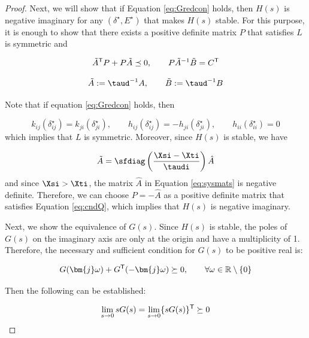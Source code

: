 \documentclass[graybox, envcountchap]{svmult}
\begin{document}
\begin{proof}
Next, we will show that if Equation \ref{eq:Gredcon} holds, then $H(s)$ is
negative imaginary for any $(\delta^{\star},E^{\star})$ that makes $H(s)$
stable. For this purpose, it is enough to show that there exists a positive
definite matrix $P$ that satisfies $L$ is symmetric and

\begin{equation}\label{eq:cndQ}
  \tilde{A}^{\sf T}P + P\tilde{A} \preceq 0
  ,\qquad
  P\tilde{A}^{-1}\tilde{B}=C^{\sf T}
\end{equation}

\begin{equation*}
  \tilde{A}:= \taud^{-1}A
  ,\qquad
  \tilde{B}:= \taud^{-1}B
\end{equation*}

Note that if equation \ref{eq:Gredcon} holds, then

\begin{equation*}
  k_{ij}(\delta_{ij}^{\star}) =
  k_{ji}(\delta_{ji}^{\star})
  ,\qquad
  h_{ij}(\delta_{ij}^{\star}) = 
  - h_{ji}(\delta_{ji}^{\star}),\qquad
  h_{ii}(\delta_{ii}^{\star}) = 0
\end{equation*}
which implies that $L$ is symmetric. Moreover, since $H(s)$ is stable, we have

\begin{equation*}
  \tilde{A} = 
  \sfdiag \left( \frac{ \Xsi -  \Xti }{ \taudi } \right)
  \hat{A}
\end{equation*}
and since $\Xsi > \Xti$, the matrix $\hat{A}$ in Equation \ref{eq:sysmats} is
negative definite. Therefore, we can choose $P=-\hat{A}$ as a positive definite
matrix that satisfies Equation \ref{eq:cndQ}, which implies that $H(s)$ is
negative imaginary.

Next, we show the equivalence of $G(s)$. Since $H(s)$ is stable, the poles of
$G(s)$ on the imaginary axis are only at the origin and have a multiplicity of
1. Therefore, the necessary and sufficient condition for $G(s)$ to be positive
real is:

\begin{equation}\label{eq:Gpr}
  G(\bm{j}\omega) + G^{\sf T}(-\bm{j}\omega) \succeq 0
  ,\qquad \forall \omega \in \mathbb{R}\setminus\{0\}
\end{equation}

Then the following can be established:

\begin{equation}\label{eq:cndG0}
  \lim_{s\rightarrow 0} s G(s) = \lim_{s\rightarrow 0} \{ s G(s)\}^{\sf T}\succeq 0
\end{equation}


\end{proof}
\end{document}
